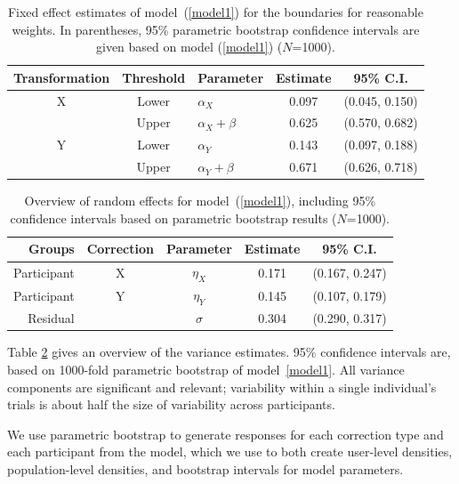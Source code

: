 \documentclass[12pt]{article}\usepackage[]{graphicx}\usepackage[]{color}
\begin{document}
\begin{appendix}
\begin{table}[htbp]\centering
%
\begin{tabular}{cclcc}
  \hline
Transformation & Threshold &  \multicolumn{1}{c}{Parameter} & Estimate & 95\% C.I. \\ 
  \hline
X & Lower & $\alpha_X$ & 0.097 & (0.045, 0.150) \\ 
   & Upper& $\alpha_X + \beta$  & 0.625 & (0.570, 0.682) \\ 
  Y & Lower& $\alpha_Y$  & 0.143 & (0.097, 0.188) \\ 
   & Upper& $\alpha_Y + \beta$  & 0.671 & (0.626, 0.718) \\ 
   \hline
\end{tabular}
\caption{Fixed effect estimates of model~(\ref{model1}) for the boundaries for reasonable weights. In parentheses,  95\% parametric bootstrap confidence intervals are given based on model (\ref{model1}) ($N$=1000).}\label{fixedeffectsresults}
\end{table}
\begin{table}[hbtp]\centering
%
\begin{tabular}{rcccc}
  \hline
Groups & Correction & Parameter & Estimate & 95\% C.I. \\ 
  \hline
  Participant & X &$\eta_X$  & 0.171 & (0.167, 0.247) \\ 
  Participant & Y &$\eta_Y$ &  0.145 & (0.107, 0.179) \\ 
  Residual &  &$\sigma$ &  0.304 & (0.290, 0.317) \\ 
   \hline
\end{tabular}
\caption{Overview of random effects for model~(\ref{model1}), including 95\% confidence intervals based on parametric bootstrap results ($N$=1000).}\label{randomeffectsresults}
\end{table}

Table \ref{randomeffectsresults} gives an overview of the variance estimates. 95\% confidence intervals are, based on 1000-fold parametric bootstrap of model~\ref{model1}. All variance components are significant and relevant; variability within a single individual's trials is about half the size of variability across  participants. 

We use parametric bootstrap to generate responses for each correction type and each participant from the model, which we use to both  create user-level densities, population-level densities, and bootstrap intervals for model parameters. 



\end{appendix}
\end{document}
